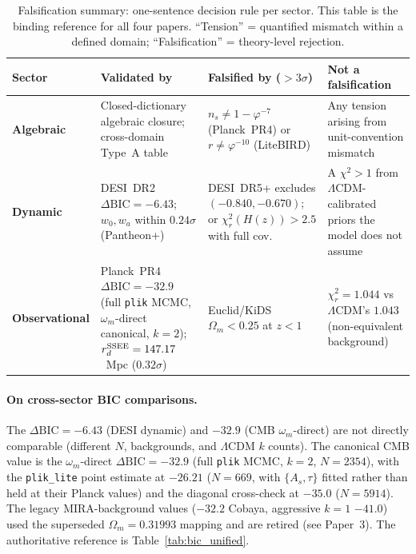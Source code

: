 \documentclass[12pt,a4paper]{article}
\newcommand{\LCDM}{\ifmmode\Lambda\mathrm{CDM}\else$\Lambda$CDM\fi}
\begin{document}
\begin{table}[H]
\centering
\caption{Falsification summary: one-sentence decision rule per sector.
  This table is the binding reference for all four papers.
  ``Tension'' = quantified mismatch within a defined domain;
  ``Falsification'' = theory-level rejection.}
\label{tab:falsification_summary}
\footnotesize
\begin{tabularx}{\textwidth}{p{2.8cm}XXX}
\toprule
Sector & Validated by & Falsified by ($>3\sigma$) & Not a falsification \\
\midrule
\textbf{Algebraic} &
  Closed-dictionary algebraic closure; cross-domain Type~A table &
  $n_s \neq 1-\varphi^{-7}$ (Planck~PR4) or $r \neq \varphi^{-10}$ (LiteBIRD) &
  Any tension arising from unit-convention mismatch \\[4pt]
\textbf{Dynamic} &
  DESI~DR2 $\Delta\mathrm{BIC}=-6.43$; $w_0,w_a$ within $0.24\sigma$ (Pantheon+) &
  DESI~DR5+ excludes $(-0.840,-0.670)$; or $\chi^2_r(H(z))>2.5$ with full cov. &
  A $\chi^2>1$ from \LCDM-calibrated priors the model does not assume \\[4pt]
\textbf{Observational} &
  Planck~PR4 $\Delta\mathrm{BIC}=-32.9$ (full \texttt{plik} MCMC, $\omega_m$-direct canonical, $k=2$); $r_d^{\rm SSEE}=147.17$~Mpc ($0.32\sigma$) &
  Euclid/KiDS $\Omega_m<0.25$ at $z<1$ &
  $\chi^2_r=1.044$ vs \LCDM's $1.043$ (non-equivalent background) \\
\bottomrule
\end{tabularx}
\end{table}

\paragraph{On cross-sector BIC comparisons.}
The $\Delta\mathrm{BIC}=-6.43$ (DESI dynamic) and $-32.9$ (CMB $\omega_m$-direct)
are not directly comparable (different $N$, backgrounds, and $\Lambda$CDM $k$ counts).
The canonical CMB value is the $\omega_m$-direct $\Delta\mathrm{BIC}=-32.9$
(full \texttt{plik} MCMC, $k=2$, $N=2354$), with the \texttt{plik\_lite} point
estimate at $-26.21$ ($N=669$, with $\{A_s,\tau\}$ fitted rather than held at their
Planck values) and the diagonal cross-check at $-35.0$ ($N=5914$).
The legacy MIRA-background values ($-32.2$ Cobaya, aggressive $k{=}1$ $-41.0$)
used the superseded $\Omega_m=0.31993$ mapping and are retired (see Paper~3).
The authoritative reference is Table~\ref{tab:bic_unified}.
\end{document}
